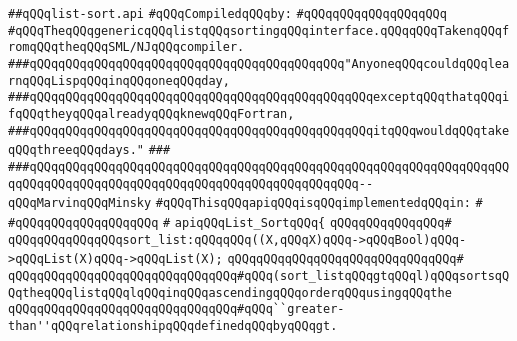 \label{src/lib/src/list-sort.api}
\verb|##qQQqlist-sort.api|\newline
\newline
\verb|#qQQqCompiledqQQqby:|\newline
\verb|#qQQqqQQqqQQqqQQqqQQq|\newline
\newline
\verb|#qQQqTheqQQqgenericqQQqlistqQQqsortingqQQqinterface.qQQqqQQqTakenqQQqfromqQQqtheqQQqSML/NJqQQqcompiler.|\newline
\newline
\newline
\verb|###qQQqqQQqqQQqqQQqqQQqqQQqqQQqqQQqqQQqqQQqqQQq"AnyoneqQQqcouldqQQqlearnqQQqLispqQQqinqQQqoneqQQqday,|\newline
\verb|###qQQqqQQqqQQqqQQqqQQqqQQqqQQqqQQqqQQqqQQqqQQqqQQqexceptqQQqthatqQQqifqQQqtheyqQQqalreadyqQQqknewqQQqFortran,|\newline
\verb|###qQQqqQQqqQQqqQQqqQQqqQQqqQQqqQQqqQQqqQQqqQQqqQQqitqQQqwouldqQQqtakeqQQqthreeqQQqdays."|\newline
\verb|###|\newline
\verb|###qQQqqQQqqQQqqQQqqQQqqQQqqQQqqQQqqQQqqQQqqQQqqQQqqQQqqQQqqQQqqQQqqQQqqQQqqQQqqQQqqQQqqQQqqQQqqQQqqQQqqQQqqQQqqQQqqQQq--qQQqMarvinqQQqMinsky|\newline
\newline
\newline
\newline
\verb|#qQQqThisqQQqapiqQQqisqQQqimplementedqQQqin:|\newline
\verb|#|\newline
\verb|#qQQqqQQqqQQqqQQqqQQq|\newline
\verb|#|\newline
\verb|apiqQQqList_SortqQQq{|\newline
\verb|qQQqqQQqqQQqqQQq#|\newline
\verb|qQQqqQQqqQQqqQQqsort_list:qQQqqQQq((X,qQQqX)qQQq->qQQqBool)qQQq->qQQqList(X)qQQq->qQQqList(X);|\newline
\verb|qQQqqQQqqQQqqQQqqQQqqQQqqQQqqQQq#|\newline
\verb|qQQqqQQqqQQqqQQqqQQqqQQqqQQqqQQq#qQQq(sort_listqQQqgtqQQql)qQQqsortsqQQqtheqQQqlistqQQqlqQQqinqQQqascendingqQQqorderqQQqusingqQQqthe|\newline
\verb|qQQqqQQqqQQqqQQqqQQqqQQqqQQqqQQq#qQQq``greater-than''qQQqrelationshipqQQqdefinedqQQqbyqQQqgt.|\newline
